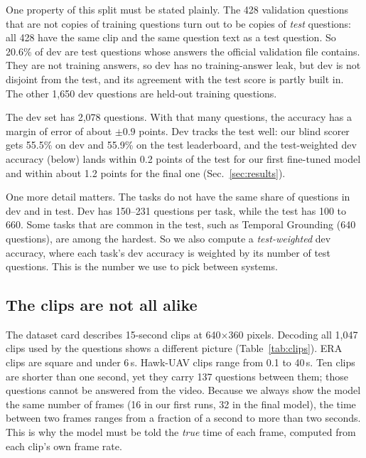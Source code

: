 One property of this split must be stated plainly. The 428 validation
questions that are not copies of training questions turn out to be copies
of \emph{test} questions: all 428 have the same clip and the same question
text as a test question. So 20.6\% of dev are test questions whose answers
the official validation file contains. They are not training answers, so
dev has no training-answer leak, but dev is not disjoint from the test,
and its agreement with the test score is partly built in. The other 1,650
dev questions are held-out training questions.

The dev set has 2,078 questions. With that many questions, the accuracy has
a margin of error of about $\pm 0.9$ points. Dev tracks the test well: our
blind scorer gets 55.5\% on dev and 55.9\% on the test leaderboard, and the
test-weighted dev accuracy (below) lands within 0.2 points of the test for
our first fine-tuned model and within about 1.2 points for the final one
(Sec.~\ref{sec:results}).

One more detail matters. The tasks do not have the same share of questions
in dev and in test. Dev has 150--231 questions per task, while the test has
100 to 660. Some tasks that are common in the test, such as Temporal
Grounding (640 questions), are among the hardest. So we also compute a
\emph{test-weighted} dev accuracy, where each task's dev accuracy is
weighted by its number of test questions. This is the number we use to
pick between systems.

\subsection{The clips are not all alike}
The dataset card describes 15-second clips at 640$\times$360 pixels.
Decoding all 1,047 clips used by the questions shows a different picture
(Table~\ref{tab:clips}). ERA clips are square and under 6\,s. Hawk-UAV
clips range from 0.1 to 40\,s. Ten clips are shorter than one second, yet
they carry 137 questions between them; those questions cannot be answered
from the video. Because we always show the model the same number of frames
(16 in our first runs, 32 in the final model), the time between two frames
ranges from a fraction of a second to more than two seconds. This is why the model must be told the \emph{true} time of each
frame, computed from each clip's own frame rate.

